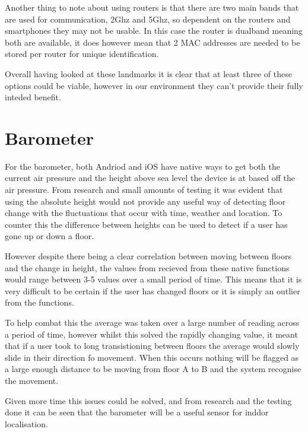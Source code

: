 \documentclass[main.tex]{subfiles}
\begin{document}
Another thing to note about using routers is that there are two main bands that are used for communication, 2Ghz and 5Ghz, so dependent on the routers and smartphones they may not be usable. In this case the router is dualband meaning both are available, it does however mean that 2 MAC addresses are needed to be stored per router for unique identification.

Overall having looked at these landmarks it is clear that at least three of these options could be viable, however in our environment they can't provide their fully inteded benefit.

\section{Barometer}

For the barometer, both Andriod and iOS have native ways to get both the current air pressure and the height above sea level the device is at based off the air pressure. From research and small amounts of testing it was evident that using the absolute height would not provide any useful way of detecting floor change with the fluctuations that occur with time, weather and location. To counter this the difference between heights can be used to detect if a user has gone up or down a floor. 

However despite there being a clear correlation between moving between floors and the change in height, the values from recieved from these native functions would range between 3-5 values over a small period of time. This means that it is very difficult to be certain if the user has changed floors or it is simply an outlier from the functions. 

To help combat this the average was taken over a large number of reading across a period of time, however whilst this solved the rapidly changing value, it meant that if a user took to long transistioning between floors the average would slowly slide in their direction fo movement. When this occurs nothing will be flagged as a large enough distance to be moving from floor A to B and the system recognise the movement. 

Given more time this issues could be solved, and from research and the testing done it can be seen that the barometer will be a useful sensor for inddor localisation.
\end{document}
